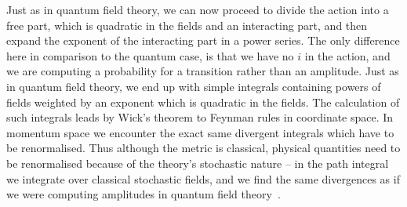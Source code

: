\documentclass[aps,preprintnumbers,superscriptaddress,longbibliography]{revtex4-1}
\begin{document}
Just as in quantum field theory, we can now proceed to divide the action into a free part, which is quadratic in the fields and an interacting part, and then expand the exponent of the interacting part in a power series. The only difference here in comparison to the quantum case, is that we have no $i$ in the action, and we are computing a probability for a transition rather than an amplitude. Just as in quantum field theory, we end up with simple integrals containing powers of fields weighted by an exponent which is quadratic in the fields. The calculation of such integrals leads by Wick's theorem to Feynman rules in coordinate space. In momentum space we encounter the exact same divergent integrals which have to be renormalised. Thus although the metric is classical, physical quantities need to be renormalised because of the theory's stochastic nature -- in the path integral we integrate over classical stochastic fields, and we find the same divergences as if we were computing amplitudes in quantum field theory~\cite{martin1973statistical}.
\end{document}
